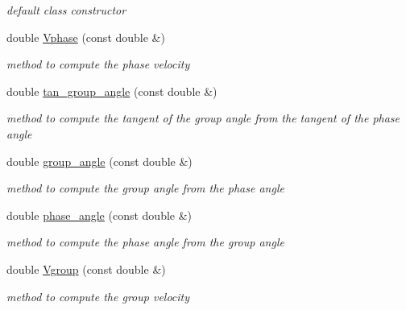 \begin{DoxyCompactItemize}
\begin{DoxyCompactList}\small\item\em default class constructor \end{DoxyCompactList}\item 
double \hyperlink{class_velocity_a51559f5012552c6d229628b231cafb56}{Vphase} (const double \&)
\begin{DoxyCompactList}\small\item\em method to compute the phase velocity \end{DoxyCompactList}\item 
double \hyperlink{class_velocity_ac11aa4675b1bb47ffc911bcac33e87b3}{tan\+\_\+group\+\_\+angle} (const double \&)
\begin{DoxyCompactList}\small\item\em method to compute the tangent of the group angle from the tangent of the phase angle \end{DoxyCompactList}\item 
double \hyperlink{class_velocity_a777312f53b67be665c6f0531baf9c9d8}{group\+\_\+angle} (const double \&)
\begin{DoxyCompactList}\small\item\em method to compute the group angle from the phase angle \end{DoxyCompactList}\item 
double \hyperlink{class_velocity_a5d0a3d765fc69ce7f5fb0baa76c8e862}{phase\+\_\+angle} (const double \&)
\begin{DoxyCompactList}\small\item\em method to compute the phase angle from the group angle \end{DoxyCompactList}\item 
double \hyperlink{class_velocity_ab81f09120d5e499952bb9e6d642e9695}{Vgroup} (const double \&)
\begin{DoxyCompactList}\small\item\em method to compute the group velocity \end{DoxyCompactList}\end{DoxyCompactItemize}

